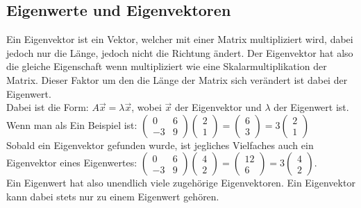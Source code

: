 \documentclass{article}
\begin{document}
	\subsection{Eigenwerte und Eigenvektoren}
	Ein Eigenvektor ist ein Vektor, welcher mit einer Matrix multipliziert wird, dabei jedoch nur die Länge, jedoch nicht die Richtung ändert. Der Eigenvektor hat also die gleiche Eigenschaft wenn multipliziert wie eine Skalarmultiplikation der Matrix. Dieser Faktor um den die Länge der Matrix sich verändert ist dabei der Eigenwert. \\
	Dabei ist die Form: $A \vec{x}=\lambda \vec{x}$, wobei $\vec{x}$ der Eigenvektor und $\lambda$ der Eigenwert ist. Wenn man als Ein Beispiel ist: $\begin{pmatrix} 0 & 6 \\ -3 & 9 \end{pmatrix}\begin{pmatrix} 2 \\ 1 \end{pmatrix}=\begin{pmatrix} 6 \\ 3 \end{pmatrix}=3 \begin{pmatrix} 2 \\ 1 \end{pmatrix}$ \\
	Sobald ein Eigenvektor gefunden wurde, ist jegliches Vielfaches auch ein Eigenvektor eines Eigenwertes: $\begin{pmatrix} 0 & 6 \\ -3 & 9 \end{pmatrix}\begin{pmatrix} 4 \\ 2 \end{pmatrix}=\begin{pmatrix} 12 \\ 6 \end{pmatrix}=3 \begin{pmatrix} 4 \\ 2 \end{pmatrix}$. \\
	Ein Eigenwert hat also unendlich viele zugehörige Eigenvektoren. Ein Eigenvektor kann dabei stets nur zu einem Eigenwert gehören.
\end{document}
